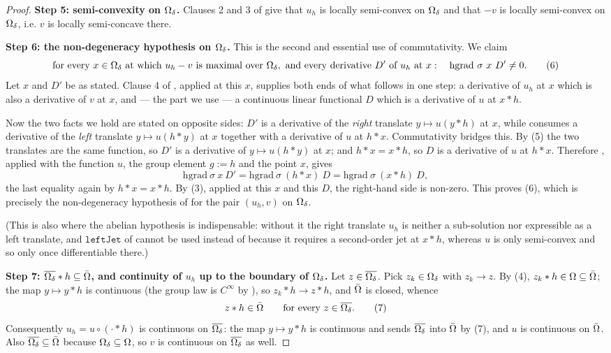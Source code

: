 \begin{proof}
\medskip\noindent\textbf{Step 5: semi-convexity on $\Omega_\delta$.} Clauses 2 and 3 of
 give that $u_h$ is locally semi-convex on $\Omega_\delta$
and that $-v$ is locally semi-convex on $\Omega_\delta$, i.e. $v$ is locally semi-concave there.

\medskip\noindent\textbf{Step 6: the non-degeneracy hypothesis on $\Omega_\delta$.} This is the
second and essential use of commutativity. We claim
\[
 \text{for every } x\in\Omega_\delta \text{ at which } u_h-v \text{ is maximal over }\Omega_\delta,
 \text{ and every derivative } D' \text{ of } u_h \text{ at } x:\quad
 \mathrm{hgrad}\ \sigma\ x\ D'\ne0 . \tag{6}
\]
Let $x$ and $D'$ be as stated. Clause 4 of , applied at
this $x$, supplies both ends of what follows in one step: a derivative of $u_h$ at $x$ which
is also a derivative of $v$ at $x$, and --- the part we use --- a continuous linear
functional $D$ which is a derivative of $u$ at $x*h$.

Now the two facts we hold are stated on opposite sides: $D'$ is a derivative of the
\emph{right} translate $y\mapsto u(y*h)$ at $x$, while  consumes
a derivative of the \emph{left} translate $y\mapsto u(h*y)$ at $x$ together with a derivative
of $u$ at $h*x$. Commutativity bridges this. By (5) the two translates are the same function,
so $D'$ is a derivative of $y\mapsto u(h*y)$ at $x$; and $h*x=x*h$, so $D$ is a derivative of
$u$ at $h*x$. Therefore , applied with the function $u$, the group
element $g:=h$ and the point $x$, gives
\[
 \mathrm{hgrad}\ \sigma\ x\ D'=\mathrm{hgrad}\ \sigma\ (h*x)\ D
 =\mathrm{hgrad}\ \sigma\ (x*h)\ D ,
\]
the last equality again by $h*x=x*h$. By (3), applied at this $x$ and this $D$, the
right-hand side is non-zero. This proves (6), which is precisely the non-degeneracy
hypothesis of  for the pair $(u_h,v)$ on
$\Omega_\delta$.

(This is also where the abelian hypothesis is indispensable: without it the right translate
$u_h$ is neither a sub-solution nor expressible as a left translate, and
$\mathtt{leftJet}$ of  cannot be used instead of
 because it requires a second-order jet at $x*h$, whereas $u$ is
only semi-convex and so only once differentiable there.)

\medskip\noindent\textbf{Step 7: $\overline{\Omega_\delta}*h\subseteq\bar{\Omega}$, and continuity of
$u_h$ up to the boundary of $\Omega_\delta$.} Let $z\in\overline{\Omega_\delta}$. Pick
$z_k\in\Omega_\delta$ with $z_k\to z$. By (4), $z_k*h\in\Omega\subseteq\bar{\Omega}$; the map
$y\mapsto y*h$ is continuous (the group law is $C^{\infty}$ by ), so
$z_k*h\to z*h$, and $\bar{\Omega}$ is closed, whence
\[
 z*h\in\bar{\Omega}\qquad\text{for every } z\in\overline{\Omega_\delta}. \tag{7}
\]
Consequently $u_h=u\circ(\cdot*h)$ is continuous on $\overline{\Omega_\delta}$: the map
$y\mapsto y*h$ is continuous and sends $\overline{\Omega_\delta}$ into $\bar{\Omega}$ by (7), and $u$
is continuous on $\bar{\Omega}$. Also $\overline{\Omega_\delta}\subseteq\bar{\Omega}$ because
$\Omega_\delta\subseteq\Omega$, so $v$ is continuous on $\overline{\Omega_\delta}$ as well.


\end{proof}
